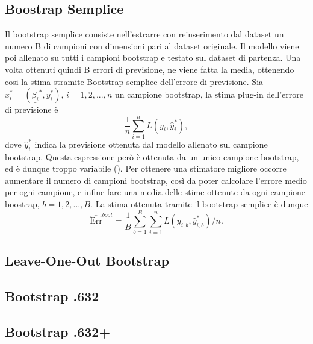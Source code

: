 \subsection{Boostrap Semplice}
\label{sec:sezione5.4.1}

Il bootstrap semplice consiste nell'estrarre con reinserimento dal dataset un numero B di campioni con dimensioni pari al dataset originale. Il modello viene poi allenato su tutti i campioni bootstrap e testato sul dataset di partenza. Una volta ottenuti quindi B errori di previsione, ne viene fatta la media, ottenendo cosi la stima stramite Bootstrap semplice dell'errore di previsione. 
Sia $x^{*}_i =  (\underline{\beta_i}^{*},y^{*}_i)$, $i = 1,2,...,n$ un campione bootstrap, la stima plug-in dell'errore di previsione è
\begin{equation}
\frac{1}{n} \sum_{i=1}^{n} L(y_i, \hat{y}^{*}_i),
\end{equation}
dove $\hat{y}^{*}_i$ indica la previsione ottenuta dal modello allenato sul campione bootstrap.
Questa espressione però è ottenuta da un unico campione bootstrap, ed è dunque troppo variabile (\cite{efron1993}). Per ottenere una stimatore migliore occorre aumentare il numero di campioni bootstrap, così da poter calcolare l'errore medio per ogni campione, e infine fare una media delle stime ottenute da ogni campione boostrap, $b = 1,2,...,B$.
La stima ottenuta tramite il bootstrap semplice è dunque
\begin{equation}
\widehat{\text{Err}}^{boot} = \frac{1}{B} \sum_{b=1}^{B} \sum_{i=1}^{n}L(y_{i,b}, \hat{y}^{*}_{i,b})/n.
\end{equation}



\subsection{Leave-One-Out Bootstrap}
\label{sec:sezione5.4.2}

\subsection{Bootstrap .632}
\label{sec:sezione5.4.3}

\subsection{Bootstrap .632+}
\label{sec:sezione5.4.4}
